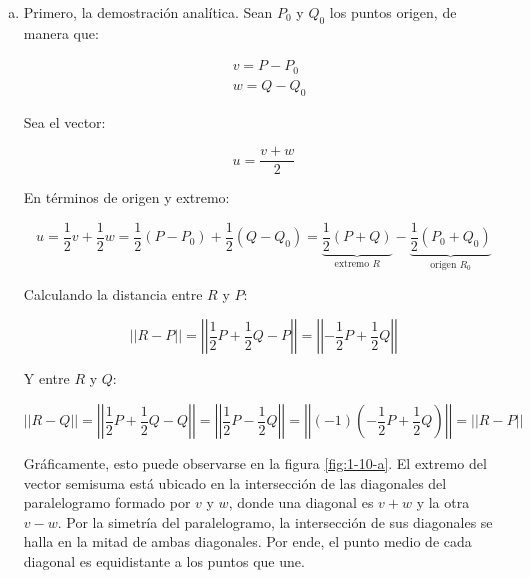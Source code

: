 \documentclass{article}
\begin{document}
\begin{enumerate}[(a)]
\item Primero, la demostración analítica. Sean $P_0$ y $Q_0$ los puntos origen, de manera que:

\begin{subequations}
\begin{align}
& v = P - P_0 \\
& w = Q - Q_0
\end{align}
\end{subequations}

Sea el vector:

\begin{equation}
u = \frac{v + w}{2}
\end{equation}

En términos de origen y extremo:

\begin{equation}
u = \frac{1}{2} v + \frac{1}{2} w = \frac{1}{2} (P-P_0) + \frac{1}{2} (Q-Q_0) = \underbrace{ \frac{1}{2} (P+Q) }_{\text{extremo } R} - \underbrace{ \frac{1}{2} (P_0+Q_0) }_{\text{origen } R_0}
\end{equation}

Calculando la distancia entre $R$ y $P$:

\begin{equation}
||R-P|| = \left|\left| \frac{1}{2} P + \frac{1}{2} Q - P \right|\right| = \left|\left| -\frac{1}{2} P + \frac{1}{2} Q \right|\right|
\end{equation}

Y entre $R$ y $Q$:

\begin{equation}
||R-Q|| = \left|\left| \frac{1}{2} P + \frac{1}{2} Q - Q \right|\right| = \left|\left| \frac{1}{2} P - \frac{1}{2} Q \right|\right| = \left|\left| (-1) \left(- \frac{1}{2} P + \frac{1}{2} Q \right) \right|\right| = ||R-P||
\end{equation}

Gráficamente, esto puede observarse en la figura \ref{fig:1-10-a}. El extremo del vector semisuma está ubicado en la intersección de las diagonales del paralelogramo formado por $v$ y $w$, donde una diagonal es $v+w$ y la otra $v-w$. Por la simetría del paralelogramo, la intersección de sus diagonales se halla en la mitad de ambas diagonales. Por ende, el punto medio de cada diagonal es equidistante a los puntos que une.


\end{enumerate}
\end{document}
